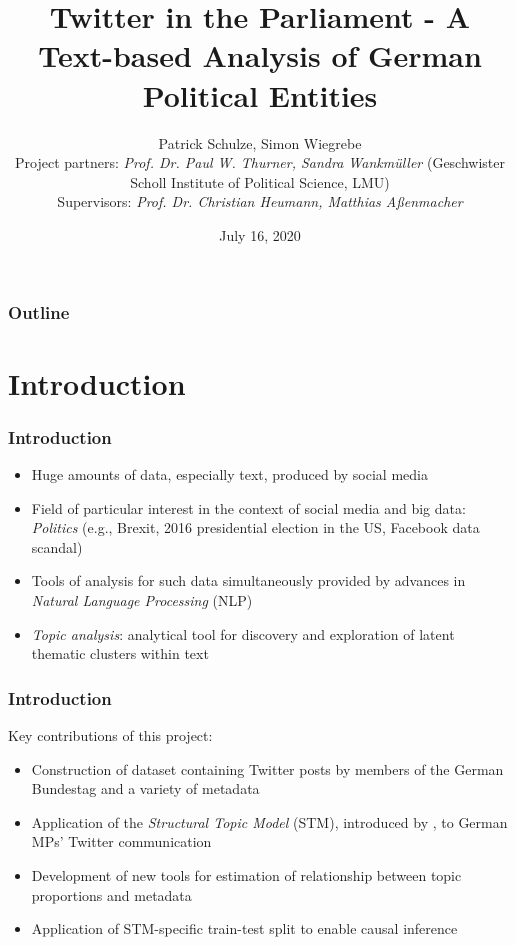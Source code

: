 \documentclass[xcolor=dvipsnames]{beamer}
\title{Twitter in the Parliament - A Text-based Analysis of German Political Entities}
\date{July 16, 2020}
\author[author1]{Patrick Schulze, Simon Wiegrebe\\[5mm]{\tiny
Project partners: \textit{Prof. Dr. Paul W. Thurner, Sandra Wankm\"uller} (Geschwister Scholl Institute of Political Science, LMU) \\[2mm]
Supervisors: \textit{Prof. Dr. Christian Heumann, Matthias A{\ss}enmacher}
}}
\begin{document}
\begin{frame}
\titlepage
\end{frame}

\begin{frame}
\frametitle{Outline}
\tableofcontents[]
\end{frame}

\section{Introduction}
\begin{frame}
\frametitle{Introduction}
\begin{itemize}
\item Huge amounts of data, especially text, produced by social media
\item Field of particular interest in the context of social media and big data: \textit{Politics} (e.g., Brexit, 2016 presidential election in the US, Facebook data scandal)
\item Tools of analysis for such data simultaneously provided by advances in \textit{Natural Language Processing} (NLP)
\item \textit{Topic analysis}: analytical tool for discovery and exploration of latent thematic clusters within text 
\end{itemize}
\end{frame}

\begin{frame}
\frametitle{Introduction}

Key contributions of this project:
\begin{itemize}
	\item Construction of dataset containing Twitter posts by members of the German Bundestag and a variety of metadata
	\item Application of the \textit{Structural Topic Model} (STM), introduced by \textcite{roberts2016model}, to German MPs' Twitter communication
	\item Development of new tools for estimation of relationship between topic proportions and metadata
	\item Application of STM-specific train-test split to enable causal inference
\end{itemize}
\end{frame}
\end{document}
